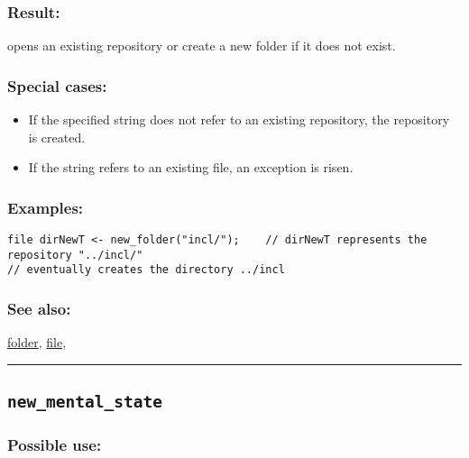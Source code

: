\documentclass[]{book}
\providecommand{\tightlist}{%
  \setlength{\itemsep}{0pt}\setlength{\parskip}{0pt}}
\theoremstyle{definition}
\theoremstyle{definition}
\theoremstyle{definition}
\theoremstyle{remark}
\begin{document}
\subsubsection{Result:}\label{result-357}

opens an existing repository or create a new folder if it does not
exist.

\subsubsection{Special cases:}\label{special-cases-104}

\begin{itemize}
\tightlist
\item
  If the specified string does not refer to an existing repository, the
  repository is created.\\
\item
  If the string refers to an existing file, an exception is risen.
\end{itemize}

\subsubsection{Examples:}\label{examples-256}

\begin{verbatim}
file dirNewT <- new_folder("incl/");    // dirNewT represents the repository "../incl/"                                                             // eventually creates the directory ../incl 
\end{verbatim}

\subsubsection{See also:}\label{see-also-148}

\href{OperatorsDH\#folder}{folder}, \href{OperatorsDH\#file}{file},

\begin{center}\rule{0.5\linewidth}{\linethickness}\end{center}

\subsection{\texorpdfstring{\texttt{new\_mental\_state}}{new\_mental\_state}}\label{new_mental_state}

\subsubsection{Possible use:}\label{possible-use-370}
\end{document}
